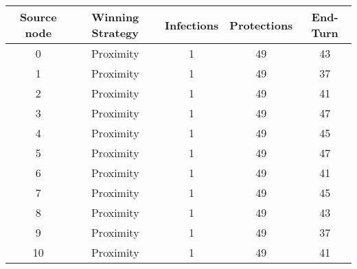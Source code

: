 \documentclass[results.tex]{subfiles}
\begin{document}
    \begin{center}
        \begin{tabular}{| c || c | c | c | c |}
            \hline
            {\bfseries Source node} & {\bfseries Winning Strategy} & {\bfseries Infections} & {\bfseries Protections}
            & {\bfseries End-Turn}
            \\  %
            \hline\hline
            0                       & Proximity                    & 1                      & 49                      & 43                   \\
            \hline
            1                       & Proximity                    & 1                      & 49                      & 37                   \\
            \hline
            2                       & Proximity                    & 1                      & 49                      & 41                   \\
            \hline
            3                       & Proximity                    & 1                      & 49                      & 47                   \\
            \hline
            4                       & Proximity                    & 1                      & 49                      & 45                   \\
            \hline
            5                       & Proximity                    & 1                      & 49                      & 47                   \\
            \hline
            6                       & Proximity                    & 1                      & 49                      & 41                   \\
            \hline
            7                       & Proximity                    & 1                      & 49                      & 45                   \\
            \hline
            8                       & Proximity                    & 1                      & 49                      & 43                   \\
            \hline
            9                       & Proximity                    & 1                      & 49                      & 37                   \\
            \hline
            10                      & Proximity                    & 1                      & 49                      & 41                   \\

\end{tabular}
\end{center}
\end{document}
